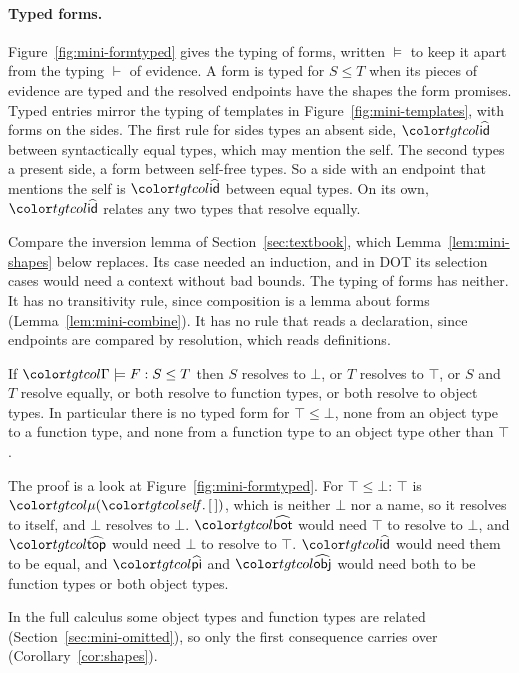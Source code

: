 \paragraph{Typed forms.}
Figure~\ref{fig:mini-formtyped} gives the typing of forms, written $\models$ to keep it apart from the typing $\vdash$ of evidence. A form is typed for $S \le T$ when its pieces of evidence are typed and the resolved endpoints have the shapes the form promises. Typed entries mirror the typing of templates in Figure~\ref{fig:mini-templates}, with forms on the sides. The first rule for sides types an absent side, $\form{id}$ between syntactically equal types, which may mention the self. The second types a present side, a form between self-free types. So a side with an endpoint that mentions the self is $\form{id}$ between equal types. On its own, $\form{id}$ relates any two types that resolve equally.

Compare the inversion lemma of Section~\ref{sec:textbook}, which Lemma~\ref{lem:mini-shapes} below replaces. Its  case needed an induction, and in DOT its selection cases would need a context without bad bounds. The typing of forms has neither. It has no transitivity rule, since composition is a lemma about forms (Lemma~\ref{lem:mini-combine}). It has no rule that reads a declaration, since endpoints are compared by resolution, which reads definitions.

\begin{lemma}[Shapes]\label{lem:mini-shapes}
If $\formj{\Gamma}{F}{S}{T}$ then $S$ resolves to $\bot$, or $T$ resolves to $\top$, or $S$ and $T$ resolve equally, or both resolve to function types, or both resolve to object types. In particular there is no typed form for $\top \le \bot$, none from an object type to a function type, and none from a function type to an object type other than $\top$.
\end{lemma}

The proof is a look at Figure~\ref{fig:mini-formtyped}. For $\top \le \bot$: $\top$ is $\obj{\tnil}$, which is neither $\bot$ nor a name, so it resolves to itself, and $\bot$ resolves to $\bot$. $\form{bot}$ would need $\top$ to resolve to $\bot$, and $\form{top}$ would need $\bot$ to resolve to $\top$. $\form{id}$ would need them to be equal, and $\form{pi}$ and $\form{obj}$ would need both to be function types or both object types.

In the full calculus some object types and function types are related (Section~\ref{sec:mini-omitted}), so only the first consequence carries over (Corollary~\ref{cor:shapes}).

